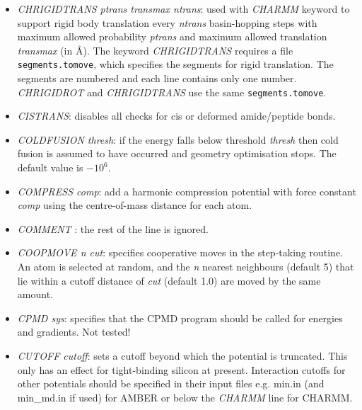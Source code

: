 \documentclass[12pt,a4paper,dvips]{article}
\begin{document}
\begin{itemize}
\item{\it CHRIGIDTRANS ptrans transmax ntrans}: used with {\it CHARMM} keyword 
to support rigid body translation every {\it ntrans} basin-hopping steps with maximum allowed 
probability {\it ptrans} and maximum allowed translation {\it transmax} (in \AA). 
The keyword {\it CHRIGIDTRANS} requires a file {\tt segments.tomove}, which specifies
the segments for rigid translation. The segments are numbered and each line contains only one number.
{\it CHRIGIDROT} and {\it CHRIGIDTRANS} use the same {\tt segments.tomove}.


\item {\it CISTRANS\/}: disables all checks for cis or deformed amide/peptide bonds.

\item {\it COLDFUSION thresh\/}: if the energy falls below threshold {\it thresh} then
cold fusion is assumed to have occurred and geometry optimisation stops.
The default value is $-10^6$.

\item {\it COMPRESS comp\/}: add a harmonic compression potential with force constant {\it comp\/} using the
centre-of-mass distance for each atom.

\item {\it COMMENT \/}: the rest of the line is ignored.

\item {\it COOPMOVE n cut\/}: specifies cooperative moves in the step-taking routine. An atom is
selected at random, and the {\it n} nearest neighbours (default 5) that lie within a cutoff
distance of {\it cut} (default 1.0) are moved by the same amount.

\item {\it CPMD sys\/}: specifies that the CPMD program should be called for energies and gradients. Not
tested!

\item {\it CUTOFF cutoff\/}: sets a cutoff beyond which the potential is truncated. This
only has an effect for tight-binding silicon at present. Interaction cutoffs for other potentials
should be specified in their input files e.g. {\textrm min.in} (and {\textrm min\_md.in} if used) 
for AMBER or below the {\it CHARMM} line for CHARMM.


\end{itemize}
\end{document}
